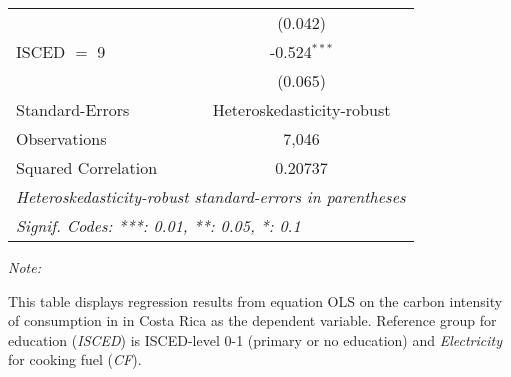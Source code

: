 \begin{table}[htbp!]
\begin{adjustbox}{width = 1\textwidth, max height = 0.95\textheight, center}
\begin{threeparttable}[b]
\begin{tabular}{lc}
                                & (0.042)\\   
            ISCED $=$ 9         & -0.524$^{***}$\\   
                                & (0.065)\\   
            \midrule 
            Standard-Errors     & Heteroskedasticity-robust \\   
            Observations        & 7,046\\  
            Squared Correlation & 0.20737\\  
            \midrule \midrule
            \multicolumn{2}{l}{\emph{Heteroskedasticity-robust standard-errors in parentheses}}\\
            \multicolumn{2}{l}{\emph{Signif. Codes: ***: 0.01, **: 0.05, *: 0.1}}\\
         \end{tabular}
         
         \begin{tablenotes}\item \medskip \textit{Note:}
            \item This table displays regression results from equation OLS on the carbon intensity of consumption in  in Costa Rica as the dependent variable. Reference group for education (\textit{ISCED}) is ISCED-level 0-1 (primary or no education) and \textit{Electricity} for cooking fuel (\textit{CF}).
         \end{tablenotes}
      \end{threeparttable}
   \end{adjustbox}
\end{table}


